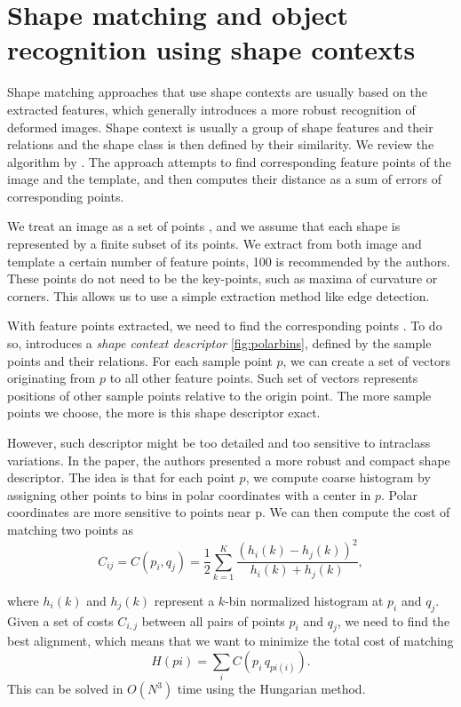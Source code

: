 \section{Shape matching and object recognition using shape contexts}
Shape matching approaches that use shape contexts are usually based on the extracted features, which generally introduces a more robust recognition of deformed images. Shape context is usually a group of shape features and their relations and the shape class is then defined by their similarity. We review the algorithm by \citet{simple}. The approach attempts to find corresponding feature points of the image and the template, and then computes their distance as a sum of errors of corresponding points.

We treat an image as a set of points , and we assume that each shape is represented by a finite subset of its points. We extract from both image and template a certain number of feature points, 100 is recommended by the authors. These points do not need to be the key-points, such as maxima of curvature or corners. This allows us to use a simple extraction method like edge detection.

With feature points extracted, we need to find the corresponding points . To do so, \citet{simple} introduces a \emph{shape context descriptor} \ref{fig:polarbins}, defined by the sample points and their relations. For each sample point $p$, we can create a set of vectors originating from $p$ to all other feature points. Such set of vectors represents positions of other sample points relative to the origin point. The more sample points we choose, the more is this shape descriptor exact.

However, such descriptor might be too detailed and too sensitive to intraclass variations. In the paper, the authors presented a more robust and compact shape descriptor. The idea is that for each point $p$, we compute coarse histogram by assigning other points to bins in polar coordinates with a center in $p$. Polar coordinates are more sensitive to points near p. We can then compute the cost of matching two points as
\[ C_{ij} =  C(p_{i},q_{j}) = \frac{1}{2} \sum_{k=1}^{K} \frac{(h_{i}(k) - h_{j}(k))^2}{h_{i}(k) + h_{j}(k)}, \]

where $ h_{i}(k) $ and $ h_{j}(k) $ represent a $k$-bin normalized histogram at $p_{i}$ and $q_{j}$. Given a set of costs $C_{i,j}$ between all pairs of points $p_{i}$ and $q_{j}$, we need to find the best alignment, which means that we want to minimize the total cost of matching 
\[ H(pi) = \sum_{i} C(p_{i}\,q_{pi(i)}). \]
This can be solved in $O(N^3)$ time using the Hungarian method\cite{simple}. 

